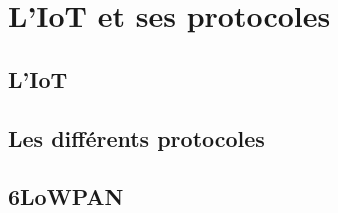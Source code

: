 
\section{L'IoT et ses protocoles}

\subsection{L'IoT}

\subsection{Les différents protocoles}

\subsection{6LoWPAN}